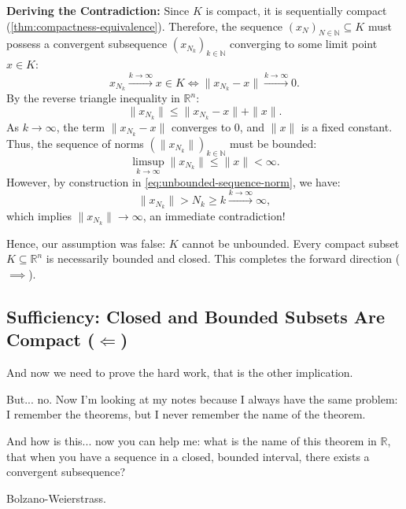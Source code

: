 \begin{proofWrapper}
\begin{content}
\textbf{Deriving the Contradiction:}
Since $K$ is compact, it is sequentially compact (\cref{thm:compactness-equivalence}). Therefore, the sequence $(x_N)_{N \in \mathbb{N}} \subseteq K$ must possess a convergent subsequence $(x_{N_k})_{k \in \mathbb{N}}$ converging to some limit point $x \in K$:
\[
x_{N_k} \xrightarrow{k \to \infty} x \in K \iff \|x_{N_k} - x\| \xrightarrow{k \to \infty} 0.
\]
By the reverse triangle inequality in $\mathbb{R}^n$:
\begin{equation}\label{eq:triangle-norm-bound}
\|x_{N_k}\| \le \|x_{N_k} - x\| + \|x\|.
\end{equation}
As $k \to \infty$, the term $\|x_{N_k} - x\|$ converges to $0$, and $\|x\|$ is a fixed constant. Thus, the sequence of norms $(\|x_{N_k}\|)_{k \in \mathbb{N}}$ must be bounded:
\[
\limsup_{k \to \infty} \|x_{N_k}\| \le \|x\| < \infty.
\]
However, by construction in \eqref{eq:unbounded-sequence-norm}, we have:
\[
\|x_{N_k}\| > N_k \ge k \xrightarrow{k \to \infty} \infty,
\]
which implies $\|x_{N_k}\| \to \infty$, an immediate contradiction!

Hence, our assumption was false: $K$ cannot be unbounded. Every compact subset $K \subseteq \mathbb{R}^n$ is necessarily bounded and closed. This completes the forward direction ($\implies$).
\end{content}

\subsection{Sufficiency: Closed and Bounded Subsets Are Compact (\texorpdfstring{$\Longleftarrow$}{<=})}

\begin{speech}[00:48:31 - 00:49:26]
And now we need to prove the hard work, that is the other implication. 

But... no. Now I'm looking at my notes because I always have the same problem: I remember the theorems, but I never remember the name of the theorem.

And how is this... now you can help me: what is the name of this theorem in $\mathbb{R}$, that when you have a sequence in a closed, bounded interval, there exists a convergent subsequence?
\end{speech}

\begin{student}
Bolzano-Weierstrass.
\end{student}


\end{proofWrapper}
